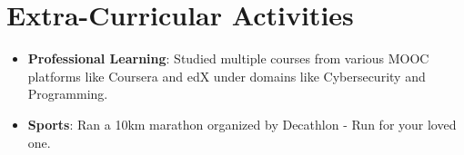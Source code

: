 \documentclass[letterpaper,11pt]{article}
\begin{document}
\section{Extra-Curricular Activities}
 \begin{itemize}
     \item { \textbf {Professional Learning}{: Studied multiple courses from various MOOC platforms like Coursera and edX under domains like Cybersecurity and Programming.}}
     \item {\textbf {Sports}{: Ran a 10km marathon organized by Decathlon - Run for your loved one.}}
 \end{itemize}

\end{document}
